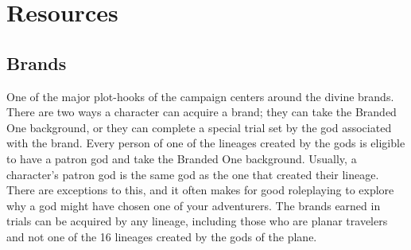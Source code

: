 \part{Resources}
\chapter{Brands}\label{Brands}
One of the major plot-hooks of the campaign centers around the divine brands. There are two ways a character can acquire a brand; they can take the Branded One background, or they can complete a special trial set by the god associated with the brand. Every person of one of the lineages created by the gods is eligible to have a patron god and take the Branded One background. Usually, a character's patron god is the same god as the one that created their lineage. There are exceptions to this, and it often makes for good roleplaying to explore why a god might have chosen one of your adventurers. The brands earned in trials can be acquired by any lineage, including those who are planar travelers and not one of the 16 lineages created by the gods of the plane.

